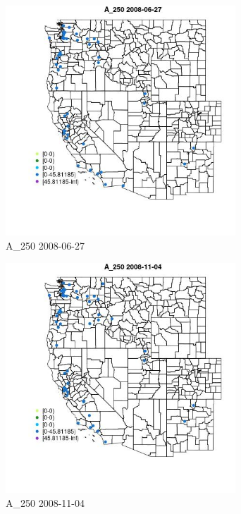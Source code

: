 \begin{figure} 
\centering  
\includegraphics[width=0.77\textwidth]{Code_Outputs/Report_ML_input_PM25_Step4_part_e_de_duplicated_aves_MapObsA_2502008-06-27.jpg} 
\caption{\label{fig:Report_ML_input_PM25_Step4_part_e_de_duplicated_avesMapObsA_2502008-06-27}A_250 2008-06-27} 
\end{figure} 
 

\begin{figure} 
\centering  
\includegraphics[width=0.77\textwidth]{Code_Outputs/Report_ML_input_PM25_Step4_part_e_de_duplicated_aves_MapObsA_2502008-11-04.jpg} 
\caption{\label{fig:Report_ML_input_PM25_Step4_part_e_de_duplicated_avesMapObsA_2502008-11-04}A_250 2008-11-04} 
\end{figure} 
 

